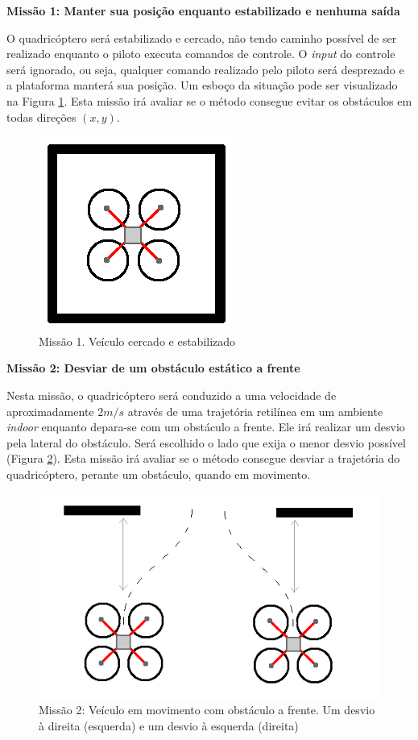 \documentclass[a4paper, 12pt]{article}
\begin{document}
 \noindent\textbf{Missão 1: Manter sua posição enquanto estabilizado e nenhuma saída}
 
 O quadricóptero será estabilizado e cercado, não tendo caminho possível de ser realizado enquanto o piloto executa comandos de controle. O \textit{input} do controle será ignorado, ou seja, qualquer comando realizado pelo piloto será desprezado e a plataforma manterá sua posição. Um esboço da situação pode ser visualizado na Figura \ref{fig:missao1}. Esta missão irá avaliar se o método consegue evitar os obstáculos em todas direções $(x,y)$.
 
 \begin{figure}[h]
 	\centering
 	\includegraphics[scale=0.5]{img/missao1.png}
 	\caption{Missão 1. Veículo cercado e estabilizado}
 	\label{fig:missao1}
 \end{figure}  
 
 \noindent\textbf{Missão 2: Desviar de um obstáculo estático a frente}
 
 Nesta missão, o quadricóptero será conduzido a uma velocidade de aproximadamente $2m/s$ através de uma trajetória retilínea em um ambiente \textit{indoor} enquanto depara-se com um obstáculo a frente. Ele irá realizar um desvio pela lateral do obstáculo. Será escolhido o lado que exija o menor desvio possível (Figura \ref{fig:missao2}). Esta missão irá avaliar se o método consegue desviar a trajetória do quadricóptero, perante um obstáculo, quando em movimento.

\begin{figure}[h]
	\centering
	\includegraphics[scale=0.5]{img/missao2.png}
	\caption{Missão 2: Veículo em movimento com obstáculo a frente. Um desvio à direita (esquerda) e um desvio à esquerda (direita)}
	\label{fig:missao2}
\end{figure}  
 
\end{document}
